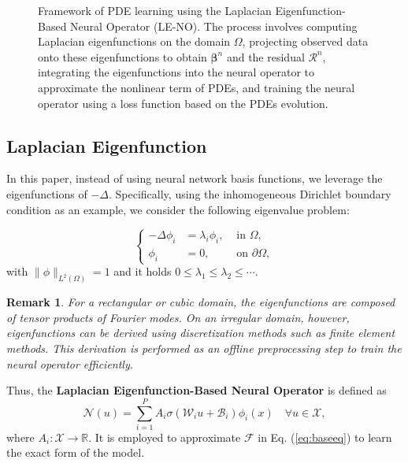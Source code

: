 \documentclass[preprint,12pt]{elsarticle}
\theoremstyle{plain}
\newtheorem{remark}{Remark}[section]
\numberwithin{figure}{section}
\numberwithin{table}{section}
\begin{document}
\begin{figure}[!htbp]
{}
	\caption{Framework of PDE learning using the Laplacian Eigenfunction-Based Neural Operator (LE-NO). The process involves computing Laplacian eigenfunctions on the domain \(\Omega\), projecting observed data onto these eigenfunctions to obtain \(\bm{\beta}^n\) and the residual \(\mathcal{R}^n\), integrating the eigenfunctions into the neural operator to approximate the nonlinear  term of PDEs, and training the neural operator using a loss function based on the PDEs evolution.}
	\label{fig:nn}
\end{figure}


\subsection{Laplacian Eigenfunction}
In this paper, instead of using neural network basis functions, we leverage the eigenfunctions of $-\Delta$. Specifically, using the inhomogeneous Dirichlet boundary condition as an example, we consider the following eigenvalue problem:

\begin{equation}
	\left\{	\begin{aligned}
		-\Delta \phi_i &= \lambda_i \phi_i, &\text{ in }\Omega,\\
		\phi_i &= 0, & \text{ on }\partial \Omega,
	\end{aligned}\right.
\end{equation}
with $\|\phi\|_{L^2(\Omega)} = 1$ and it holds $0\le\lambda_1\le \lambda_2\le \cdots$. 
\begin{remark}
	For a rectangular or cubic domain, the eigenfunctions are composed of tensor products of Fourier modes. On an irregular domain, however, eigenfunctions can be derived using discretization methods such as finite element methods. This derivation is performed as an offline preprocessing step to train the neural operator efficiently. 
\end{remark}


Thus, the \textbf{Laplacian Eigenfunction-Based Neural Operator} is defined as 
\begin{equation}
	\mathcal{N}({u}) = \sum_{i=1}^P {A}_i \sigma\left(\mathcal{W}_i {u} + \mathcal{B}_i\right)\phi_i(x) \quad \forall {u} \in \mathcal{X}, \label{LENO}
\end{equation}
where $A_i:\mathcal{X}\rightarrow\mathbb{R}$. It is employed to approximate $\mathcal{F}$ in Eq. (\ref{eq:baseeq}) to learn the exact form of the model.
\end{document}
